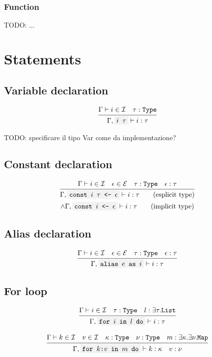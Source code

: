 \documentclass[11pt]{report}
\newcommand{\infrule}[3][gathered]{\frac{\begin{#1}#2\end{#1}}{\begin{gathered}#3\end{gathered}}}
\newcommand{\then}{\vdash}
\newcommand{\code}[1]{\texttt{\colorbox{gray!10}{#1}}}
\newcommand{\expr}{\epsilon}
\newcommand{\Id}{\mathcal{I}}
\newcommand{\Expr}{\mathcal{E}}
\newcommand{\Type}{\texttt{Type}}
\newcommand{\List}{\texttt{List}}
\newcommand{\Map}{\texttt{Map}}
\newcommand{\Env}{\Gamma}
\theoremstyle{definition}
\newcommand{\comment}[1]{
	\parbox{0.9\linewidth}{\color{black!30}\small\sffamily #1}
}
\begin{document}
\subsubsection{Function}

\comment{TODO: ...}

\newpage

\section{Statements}

\subsection{Variable declaration}

\[
	\infrule{
		\Env\then i \in \Id \quad \tau:\Type
	}{
		\Env, \code{$i$ $\tau$} \then i:\tau
	}
\]

\comment{TODO: specificare il tipo Var come da implementazione?}

\subsection{Constant declaration}

\[
	\infrule{
		\Env\then i \in \Id \quad \expr \in \Expr \quad \tau:\Type \quad \expr:\tau
	}{
		\Env, \code{const $i$ $\tau$ <- $\expr$} \then i:\tau \qquad \text{(esplicit type)} \\*
		\land \Env, \code{const $i$ <- $\expr$} \then i:\tau \qquad \text{(implicit type)}
	}
\]

\subsection{Alias declaration}

\[
	\infrule{
		\Env\then i \in \Id \quad \expr \in \Expr \quad \tau:\Type \quad \expr:\tau
	}{
		\Env, \code{alias $e$ as $i$} \then i:\tau
	}
\]

\subsection{For loop}

\[
	\infrule{
		\Env\then i \in \Id \quad \tau:\Type \quad l:\exists\tau.\List
	}{
		\Env, \code{for $i$ in $l$ do} \then i:\tau
	}
\]

\[
	\infrule{
		\Env\then k \in \Id \quad v \in \Id \quad \kappa:\Type \quad \nu:\Type \quad m:\exists\kappa.\exists\nu.\Map
	}{
		\Env, \code{for $k$:$v$ in $m$ do} \then k:\kappa \quad v:\nu
	}
\]
\end{document}
